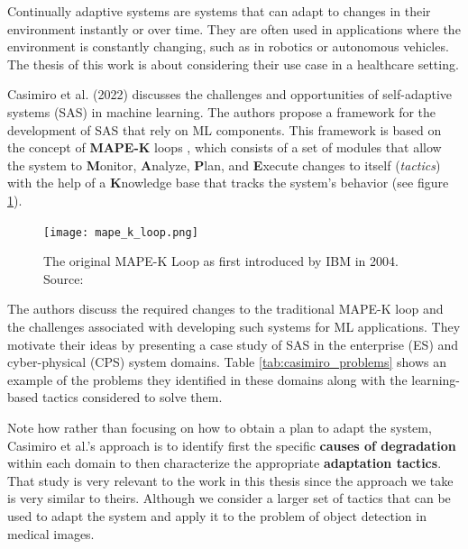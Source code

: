 \documentclass[../main.tex]{subfiles}
\begin{document}
    Continually adaptive systems are systems that can adapt to changes in their environment instantly or over time. They are often used in applications where the environment is constantly changing, such as in robotics or autonomous vehicles. The thesis of this work is about considering their use case in a healthcare setting. 

    Casimiro et al. (2022) discusses the challenges and opportunities of self-adaptive systems (SAS) in machine learning. The authors propose a framework for the development of SAS that rely on ML components. This framework is based on the concept of \textbf{MAPE-K} loops \cite{kephartVisionAutonomicComputing2003}, which consists of a set of modules that allow the system to \textbf{M}onitor, \textbf{A}nalyze, \textbf{P}lan, and \textbf{E}xecute changes to itself (\textit{tactics}) with the help of a \textbf{K}nowledge base that tracks the system's behavior (see figure \ref{fig:mape-k}).

    \begin{figure}[h]
        \centering
        \texttt{[image: mape\_k\_loop.png]}
        \caption{The original MAPE-K Loop as first introduced by IBM in 2004. Source: \cite{redbooks_practical_2004}}
        \label{fig:mape-k}
    \end{figure}
    
    The authors discuss the required changes to the traditional MAPE-K loop and the challenges associated with developing such systems for ML applications. They motivate their ideas by presenting a case study of SAS in the enterprise (ES) and cyber-physical (CPS) system domains. Table \ref{tab:casimiro_problems} shows an example of the problems they identified in these domains along with the learning-based tactics considered to solve them.
    
    Note how rather than focusing on how to obtain a plan to adapt the system, Casimiro et al.'s approach is to identify first the specific \textbf{causes of degradation} within each domain to then characterize the appropriate \textbf{adaptation tactics}. That study is very relevant to the work in this thesis since the approach we take is very similar to theirs. Although we consider a larger set of tactics that can be used to adapt the system and apply it to the problem of object detection in medical images.
    
\end{document}
